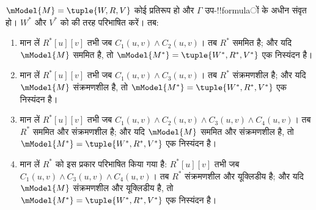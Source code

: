 \documentclass[../../../include/open-logic-section]{subfiles}
\begin{document}
\begin{thm}
  $\mModel{M} =\tuple{W,R,V}$ कोई प्रतिरूप हो और $\Gamma$
  उप-!!{formula}ों के अधीन संवृत हो। $W^*$ और $V^*$ को
   की तरह परिभाषित करें। तब:
  \begin{enumerate}
  \item मान लें $R^*[u][v]$ तभी जब $C_1(u, v) \land C_2(u,v)$। तब
    $R^*$ सममित है; और यदि $\mModel{M}$ सममित है, तो $\mModel{M^*} =
    \tuple{W^*,R^*,V^*}$ एक निस्यंदन है।
  \item मान लें $R^*[u][v]$ तभी जब $C_1(u, v) \land C_3(u,v)$। तब
    $R^*$ संक्रमणशील है; और यदि $\mModel{M}$ संक्रमणशील है, तो
    $\mModel{M^*}=\tuple{W^*,R^*,V^*}$ एक निस्यंदन है।
  \item मान लें $R^*[u][v]$ तभी जब $C_1(u, v) \land C_2(u,v) \land
    C_3(u,v) \land C_4(u,v)$। तब $R^*$ सममित और संक्रमणशील है; और यदि
    $\mModel{M}$ सममित और संक्रमणशील है, तो
    $\mModel{M^*}=\tuple{W^*,R^*,V^*}$ एक निस्यंदन है।
  \item मान लें $R^*$ को इस प्रकार परिभाषित किया गया है: $R^*[u][v]$
    तभी जब $C_1(u, v) \land C_3(u,v) \land C_4(u,v)$। तब $R^*$
    संक्रमणशील और यूक्लिडीय है; और यदि $\mModel{M}$ संक्रमणशील और
    यूक्लिडीय है, तो $\mModel{M^*}=\tuple{W^*,R^*,V^*}$ एक निस्यंदन है।
  \end{enumerate}
\end{thm}
\end{document}
